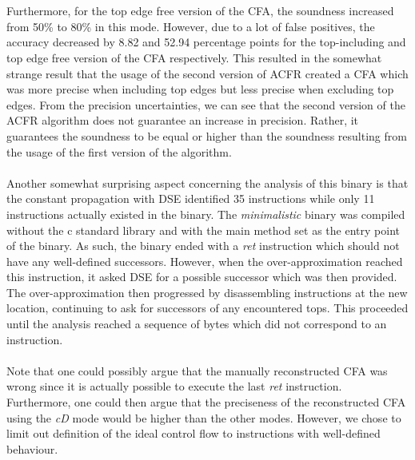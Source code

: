 \documentclass{kththesis}
\renewcommand{\it}[1]{\textit{#1}}
\begin{document}
\\ \\
Furthermore, for the top edge free version of the CFA, the soundness increased from 50\% to 80\% in this mode. However, due to a lot of false positives, the accuracy decreased by 8.82 and 52.94 percentage points for the top-including and top edge free version of the CFA respectively. This resulted in the somewhat strange result that the usage of the second version of ACFR created a CFA which was more precise when including top edges but less precise when excluding top edges. From the precision uncertainties, we can see that the second version of the ACFR algorithm does not guarantee an increase in precision. Rather, it guarantees the soundness to be equal or higher than the soundness resulting from the usage of the first version of the algorithm.
\\ \\
Another somewhat surprising aspect concerning the analysis of this binary is that the constant propagation with DSE identified 35 instructions while only 11 instructions actually existed in the binary. The \it{minimalistic} binary was compiled without the c standard library and with the main method set as the entry point of the binary. As such, the binary ended with a \it{ret} instruction which should not have any well-defined successors. However, when the over-approximation reached this instruction, it asked DSE for a possible successor which was then provided. The over-approximation then progressed by disassembling instructions at the new location, continuing to ask for successors of any encountered tops. This proceeded until the analysis reached a sequence of bytes which did not correspond to an instruction.
\\ \\
Note that one could possibly argue that the manually reconstructed CFA was wrong since it is actually possible to execute the last \it{ret} instruction. Furthermore, one could then argue that the preciseness of the reconstructed CFA using the \it{cD} mode would be higher than the other modes. However, we chose to limit out definition of the ideal control flow to instructions with well-defined behaviour. 
\end{document}

